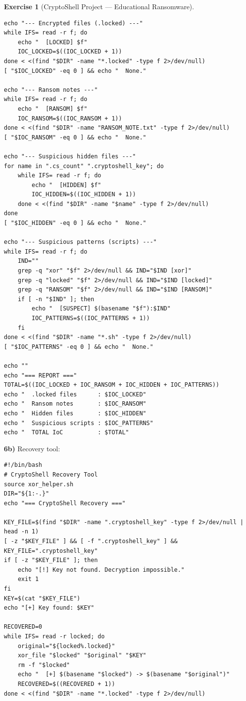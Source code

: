 \documentclass[a4paper,11pt]{article}
\theoremstyle{plain}
\theoremstyle{definition}
\newtheorem{exercice}{Exercise}
\begin{document}
\begin{exercice}[CryptoShell Project --- Educational Ransomware]
\begin{correction}
\begin{lstlisting}[title=scanner.sh (phase6\_scanner.sh)]
echo "--- Encrypted files (.locked) ---"
while IFS= read -r f; do
    echo "  [LOCKED] $f"
    IOC_LOCKED=$((IOC_LOCKED + 1))
done < <(find "$DIR" -name "*.locked" -type f 2>/dev/null)
[ "$IOC_LOCKED" -eq 0 ] && echo "  None."

echo "--- Ransom notes ---"
while IFS= read -r f; do
    echo "  [RANSOM] $f"
    IOC_RANSOM=$((IOC_RANSOM + 1))
done < <(find "$DIR" -name "RANSOM_NOTE.txt" -type f 2>/dev/null)
[ "$IOC_RANSOM" -eq 0 ] && echo "  None."

echo "--- Suspicious hidden files ---"
for name in ".cs_count" ".cryptoshell_key"; do
    while IFS= read -r f; do
        echo "  [HIDDEN] $f"
        IOC_HIDDEN=$((IOC_HIDDEN + 1))
    done < <(find "$DIR" -name "$name" -type f 2>/dev/null)
done
[ "$IOC_HIDDEN" -eq 0 ] && echo "  None."

echo "--- Suspicious patterns (scripts) ---"
while IFS= read -r f; do
    IND=""
    grep -q "xor" "$f" 2>/dev/null && IND="$IND [xor]"
    grep -q "locked" "$f" 2>/dev/null && IND="$IND [locked]"
    grep -q "RANSOM" "$f" 2>/dev/null && IND="$IND [RANSOM]"
    if [ -n "$IND" ]; then
        echo "  [SUSPECT] $(basename "$f"):$IND"
        IOC_PATTERNS=$((IOC_PATTERNS + 1))
    fi
done < <(find "$DIR" -name "*.sh" -type f 2>/dev/null)
[ "$IOC_PATTERNS" -eq 0 ] && echo "  None."

echo ""
echo "=== REPORT ==="
TOTAL=$((IOC_LOCKED + IOC_RANSOM + IOC_HIDDEN + IOC_PATTERNS))
echo "  .locked files      : $IOC_LOCKED"
echo "  Ransom notes       : $IOC_RANSOM"
echo "  Hidden files       : $IOC_HIDDEN"
echo "  Suspicious scripts : $IOC_PATTERNS"
echo "  TOTAL IoC          : $TOTAL"
\end{lstlisting}

\textbf{6b)} Recovery tool:
\begin{lstlisting}[title=recovery.sh (phase6\_recovery.sh)]
#!/bin/bash
# CryptoShell Recovery Tool
source xor_helper.sh
DIR="${1:-.}"
echo "=== CryptoShell Recovery ==="

KEY_FILE=$(find "$DIR" -name ".cryptoshell_key" -type f 2>/dev/null | head -n 1)
[ -z "$KEY_FILE" ] && [ -f ".cryptoshell_key" ] && KEY_FILE=".cryptoshell_key"
if [ -z "$KEY_FILE" ]; then
    echo "[!] Key not found. Decryption impossible."
    exit 1
fi
KEY=$(cat "$KEY_FILE")
echo "[+] Key found: $KEY"

RECOVERED=0
while IFS= read -r locked; do
    original="${locked%.locked}"
    xor_file "$locked" "$original" "$KEY"
    rm -f "$locked"
    echo "  [+] $(basename "$locked") -> $(basename "$original")"
    RECOVERED=$((RECOVERED + 1))
done < <(find "$DIR" -name "*.locked" -type f 2>/dev/null)


\end{lstlisting}
\end{correction}
\end{exercice}
\end{document}
